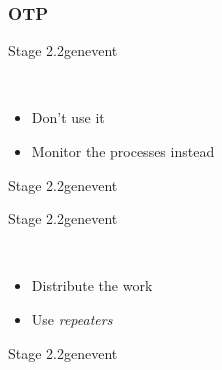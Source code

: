 \documentclass[utf8]{beamer}
\begin{document}
\subsubsection{OTP}
\begin{frame}{Stage 2.2}{gen\textunderscore event}
	\begin{description}
		\item<+->[sup\textunderscore handler]\ \\
			\begin{itemize}
				\item Don't use it
				\item Monitor the processes instead
			\end{itemize}
	\end{description}
\end{frame}
\begin{frame}{Stage 2.2}{gen\textunderscore event}
	\only<1>{\suphandler}
	\only<2>{\suphandlerinfo}
\end{frame}
\begin{frame}{Stage 2.2}{gen\textunderscore event}
	\begin{description}
		\item<+->[Long Delivery Queues]\ \\
			\begin{itemize}
				\item Distribute the work
				\item Use \emph{repeaters}
			\end{itemize}
	\end{description}
\end{frame}
\begin{frame}{Stage 2.2}{gen\textunderscore event}
\repeater
\end{frame}
\end{document}
